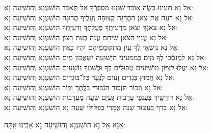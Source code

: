 \documentclass[twoside, openany, parskip=half, 11pt]{book}
\begin{document}
\begin{small}
אֵל נָא תָּעִֽינוּ כְּשֶׂה אוֹבֵד שְׁמֵֽנוּ מִסִּפְרְֿךָ אַל תְּאַבֵּד	\hfill	הוֹשַׁעְנָא וְהוֹשִֽׁיעָה נָּא: \\
אֵל נָא 		רְעֵה אֶת־צֹאן הַהֲרֵגָה קְצוּפָה וְעָלֶֽיךָ הֲרוּגָה 	\hfill	הוֹשַׁעְנָא וְהוֹשִֽׁיעָה נָּא:\\
אֵל נָא 		צֹאנְֿךָ וְצֹאן מַרְעִיתֶֽךָ פְּעֻלָּתְךָ וְרַעְיָתֶֽךָ 	\hfill	הוֹשַׁעְנָא וְהוֹשִֽׁיעָה נָּא:\\
אֵל נָא 		עֲנִיֵּי הַצֹּאן שִׂיחָם עֲנֵה בְּעֵת רָצוֹן 		\hfill	הוֹשַׁעְנָא וְהוֹשִֽׁיעָה נָּא:\\
אֵל נָא 		נוֹשְֿׂאֵי לְךָ עַֽיִן מִתְקוֹמֲמֵֽיהֶם יִהְיוּ כְאַֽיִן 	\hfill	הוֹשַׁעְנָא וְהוֹשִֽׁיעָה נָּא:\\
אֵל נָא 		לִמְנַסְּֿכֵי לְךָ מַֽיִם כְּמִמַּעַיְנֵי הַיְשׁוּעָה יִשְׁאֲבוּן מַֽיִם \hfill 	הוֹשַׁעְנָא וְהוֹשִֽׁיעָה נָּא:\\
אֵל נָא 		יַעֲלוּ לְצִיּוֹן מוֹשִׁיעִים טְפוּלִים בְּךָ וּבְשִׁמְךָ נוֹשָׁעִים \hfill 	הוֹשַׁעְנָא וְהוֹשִֽׁיעָה נָּא:\\
אֵל נָא 		חֲמוּץ בְּגָדִים זְעוֹם לְנַעֵר כָּל־בּוֹגְֿדִים 		\hfill	הוֹשַׁעְנָא וְהוֹשִֽׁיעָה נָּא:\\
אֵל נָא 		וְזָכוֹר תִּזְכּוֹר הַנְּֿכוּרֵי בְּלֶֽתֶךְ וָכוֹר 		\hfill	הוֹשַׁעְנָא וְהוֹשִֽׁיעָה נָּא:\\
אֵל נָא 		דּוֹרְֿשֶֽׁיךָ בְּעַנְפֵי עֲרָבוֹת גַּעְיָם שְׁעֵה מֵעֲרָבוֹת 	\hfill	הוֹשַׁעְנָא וְהוֹשִֽׁיעָה נָּא:\\
אֵל נָא 		בָּרֵךְ בְּעִטּוּר שָׁנָה אֲמָרַי בְּפִלּוּלִי שְׁעֵה נָא 	\hfill	הוֹשַׁעְנָא וְהוֹשִֽׁיעָה נָּא:

\end{small}

\begin{large}
 אָנָּא אֵל נָא הוֹשַׁעְנָא וְהוֹשִֽׁיעָה נָּא אָבִֽינוּ אַֽתָּה:
 
\end{large}
\end{document}
